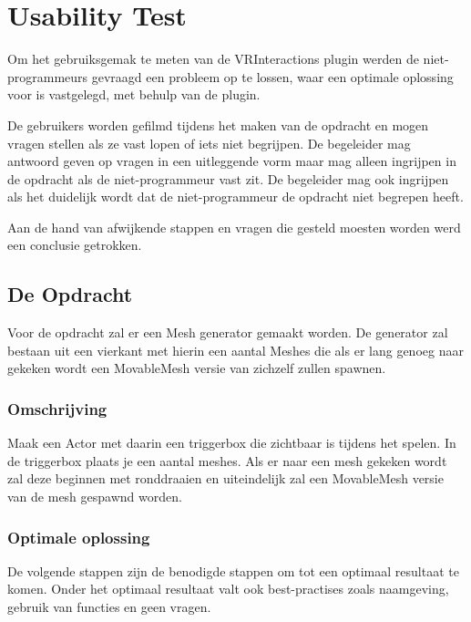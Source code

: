 
\chapter{Usability Test}
\label{appendix:usertest1}
\lhead{}

Om het gebruiksgemak te meten van de VRInteractions plugin werden de niet-programmeurs gevraagd een probleem op te lossen, waar een optimale oplossing voor is vastgelegd, met behulp van de plugin. 

De gebruikers worden gefilmd tijdens het maken van de opdracht en mogen vragen stellen als ze vast lopen of iets niet begrijpen. De begeleider mag antwoord geven op vragen in een uitleggende vorm maar mag alleen ingrijpen in de opdracht als de niet-programmeur vast zit. De begeleider mag ook ingrijpen als het duidelijk wordt dat de niet-programmeur de opdracht niet begrepen heeft.

Aan de hand van afwijkende stappen en vragen die gesteld moesten worden werd een conclusie getrokken.

\section{De Opdracht}
Voor de opdracht zal er een Mesh generator gemaakt worden. De generator zal bestaan uit een vierkant met hierin een aantal Meshes die als er lang genoeg naar gekeken wordt een MovableMesh versie van zichzelf zullen spawnen.

\subsection{Omschrijving}
Maak een Actor met daarin een triggerbox die zichtbaar is tijdens het spelen. In de triggerbox plaats je een aantal meshes. Als er naar een mesh gekeken wordt zal deze beginnen met ronddraaien en uiteindelijk zal een MovableMesh versie van de mesh gespawnd worden. 

\subsection{Optimale oplossing}
De volgende stappen zijn de benodigde stappen om tot een optimaal resultaat te komen. Onder het optimaal resultaat valt ook best-practises zoals naamgeving, gebruik van functies en geen vragen.

